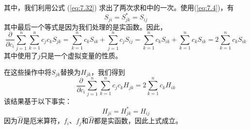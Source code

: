     其中，我们利用公式 (\ref{eq:7.32}) 求出了两次求和中的一次。使用(\ref{eq:7.4})，有
    \begin{equation}
        S_{ji} = S_{jk}^{\ast} = S_{ij}
        \label{eq:8.49}
    \end{equation}
    其中最后一个等式是因为我们处理的是实函数。因此，
    \begin{equation}
        \frac{\partial}{\partial c_i}\sum_{j=1}^{n}\sum_{k=1}^{n}c_jc_kS_{jk} = \sum_{k=1}^{n}c_kS_{ik} + \sum_{j=1}^{n}c_jS_{ij} = \sum_{k=1}^{n}c_kS_{ik} + \sum_{k=1}^{n}c_kS_{ik} = 2\sum_{k=1}^{n}c_kS_{ik}
        \label{eq:8.50}
    \end{equation}
    其中使用了$j$只是一个虚拟变量的性质。

    在这些操作中将$S_{jk}$替换为$H_{jk}$，我们得到
    \begin{equation}
        \frac{\partial}{\partial c_i}\sum_{j=1}^{n}\sum_{k=1}^{n}c_jc_kH_{jk} = 2\sum_{k=1}^{n}c_kH_{ik}
        \label{eq:8.51}
    \end{equation}
    该结果基于以下事实：
    \begin{equation}
        H_{ji} = H_{jk}^{\ast} = H_{ij}
        \label{eq:8.52}
    \end{equation}
    因为$\hat{H}$是厄米算符，$f_i$、$f_j$和$\hat{H}$都是实函数，因此上式成立。

